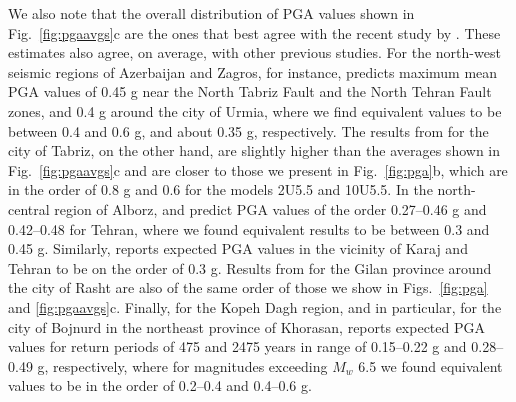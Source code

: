 

We also note that the overall distribution of PGA values shown in Fig.~\ref{fig:pgaavgs}c are the ones that best agree with the recent study by \citet{Khodaverdian_2016_BSSA}. These estimates also agree, on average, with other previous studies. For the north-west seismic regions of Azerbaijan and Zagros, for instance, \citet{Tavakoli1999} predicts maximum mean PGA values of 0.45 g near the North Tabriz Fault and the North Tehran Fault zones, and 0.4 g around the city of Urmia, where we find equivalent values to be between 0.4 and 0.6 g, and about 0.35 g, respectively. The results from \citet{Vafaie2011} for the city of Tabriz, on the other hand, are slightly higher than the averages shown in Fig.~\ref{fig:pgaavgs}c and are closer to those we present in Fig.~\ref{fig:pga}b, which are in the order of 0.8 g and 0.6 for the models 2U5.5 and 10U5.5. In the north-central region of Alborz, \citet{Ghodrati2003} and \citet{Boostan2015} predict PGA values of the order 0.27--0.46 g and 0.42--0.48 for Tehran, where we found equivalent results to be between 0.3 and 0.45 g. Similarly, \citet{Abdi2013} reports expected PGA values in the vicinity of Karaj and Tehran to be on the order of 0.3 g. Results from \citet{Ghodrati2008} for the Gilan province around the city of Rasht are also of the same order of those we show in Figs.~\ref{fig:pga} and \ref{fig:pgaavgs}c. Finally, for the Kopeh Dagh region, and in particular, for the city of Bojnurd in the northeast province of Khorasan, \citet{Rahgozar2012} reports expected PGA values for return periods of 475 and 2475 years in range of 0.15--0.22 g and 0.28--0.49 g, respectively, where for magnitudes exceeding $M_w$ 6.5 we found equivalent values to be in the order of 0.2--0.4 and 0.4--0.6 g. 

